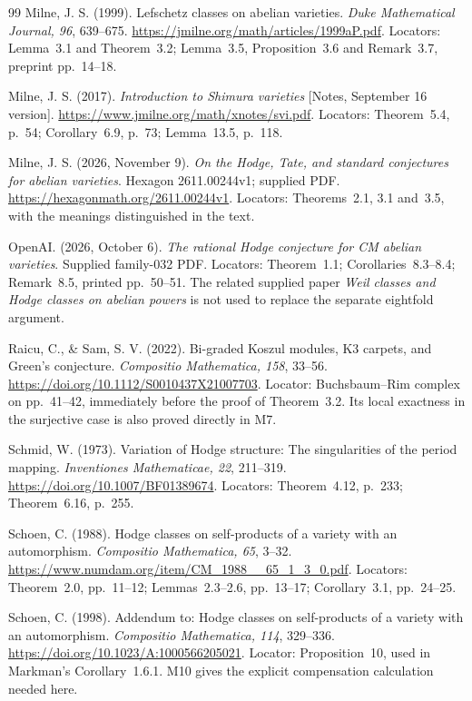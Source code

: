 \documentclass[11pt,a4paper]{article}
\theoremstyle{definition}\newtheorem{definition}[theorem]{Definition}
\theoremstyle{remark}\newtheorem{remark}[theorem]{Remark}
\begin{document}
\begin{thebibliography}{99}
Milne, J. S. (1999). Lefschetz classes on abelian varieties. \emph{Duke Mathematical Journal, 96}, 639--675. \url{https://jmilne.org/math/articles/1999aP.pdf}. Locators: Lemma~3.1 and Theorem~3.2; Lemma~3.5, Proposition~3.6 and Remark~3.7, preprint pp.~14--18.

Milne, J. S. (2017). \emph{Introduction to Shimura varieties} [Notes, September 16 version]. \url{https://www.jmilne.org/math/xnotes/svi.pdf}. Locators: Theorem~5.4, p.~54; Corollary~6.9, p.~73; Lemma~13.5, p.~118.

Milne, J. S. (2026, November 9). \emph{On the Hodge, Tate, and standard conjectures for abelian varieties}. Hexagon 2611.00244v1; supplied PDF. \url{https://hexagonmath.org/2611.00244v1}. Locators: Theorems~2.1, 3.1 and~3.5, with the meanings distinguished in the text.

OpenAI. (2026, October 6). \emph{The rational Hodge conjecture for CM abelian varieties}. Supplied family-032 PDF. Locators: Theorem~1.1; Corollaries~8.3--8.4; Remark~8.5, printed pp.~50--51. The related supplied paper \emph{Weil classes and Hodge classes on abelian powers} is not used to replace the separate eightfold argument.

Raicu, C., \& Sam, S. V. (2022). Bi-graded Koszul modules, K3 carpets, and Green's conjecture. \emph{Compositio Mathematica, 158}, 33--56. \url{https://doi.org/10.1112/S0010437X21007703}. Locator: Buchsbaum--Rim complex on pp.~41--42, immediately before the proof of Theorem~3.2. Its local exactness in the surjective case is also proved directly in M7.

Schmid, W. (1973). Variation of Hodge structure: The singularities of the period mapping. \emph{Inventiones Mathematicae, 22}, 211--319. \url{https://doi.org/10.1007/BF01389674}. Locators: Theorem~4.12, p.~233; Theorem~6.16, p.~255.

Schoen, C. (1988). Hodge classes on self-products of a variety with an automorphism. \emph{Compositio Mathematica, 65}, 3--32. \url{https://www.numdam.org/item/CM_1988__65_1_3_0.pdf}. Locators: Theorem~2.0, pp.~11--12; Lemmas~2.3--2.6, pp.~13--17; Corollary~3.1, pp.~24--25.

Schoen, C. (1998). Addendum to: Hodge classes on self-products of a variety with an automorphism. \emph{Compositio Mathematica, 114}, 329--336. \url{https://doi.org/10.1023/A:1000566205021}. Locator: Proposition~10, used in Markman's Corollary~1.6.1. M10 gives the explicit compensation calculation needed here.


\end{thebibliography}
\end{document}
